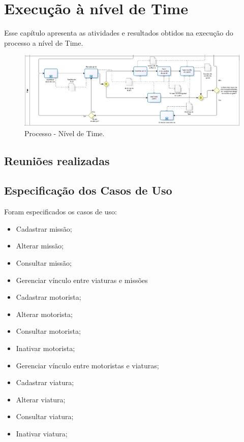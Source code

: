 \chapter{Execução à nível de Time}

  Esse capítulo apresenta as atividades e resultados obtidos na execução do processo a nível de Time.
  
  \begin{figure}[!htbp]
    \centering
    \includegraphics[scale=0.33]{figuras/processo_time}
    \caption[Processo - Nível de Time]{Processo - Nível de Time.}
    \label{processo_time}
  \end{figure}
  
  \section{Reuniões realizadas}
  
  
  \section{Especificação dos Casos de Uso}
 
  Foram especificados os casos de uso:
  
  \begin{itemize}
    \item Cadastrar missão;
    \item Alterar missão;
    \item Consultar missão;
    \item Gerenciar vínculo entre viaturas e missões
    \item Cadastrar motorista;
    \item Alterar motorista;
    \item Consultar motorista;
    \item Inativar motorista;
    \item Gerenciar vínculo entre motoristas e viaturas;
    \item Cadastrar viatura;
    \item Alterar viatura;
    \item Consultar viatura;
    \item Inativar viatura;
  \end{itemize}

